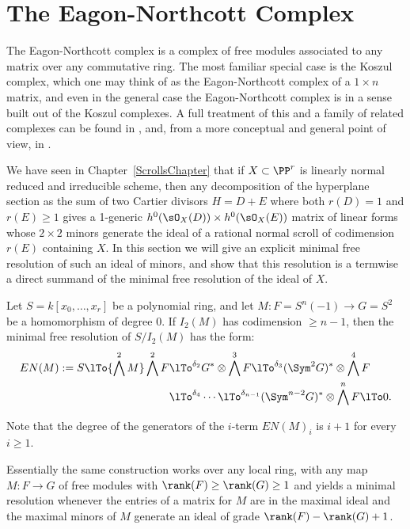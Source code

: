 \section{The Eagon-Northcott Complex}\label{EN section}

The Eagon-Northcott complex is a complex of free modules associated to any matrix over any commutative ring. The most familiar special case is the Koszul complex, which one may think of as the Eagon-Northcott complex of a $1\times n$ matrix, and  even in the general case the Eagon-Northcott complex is in a sense built out of the Koszul complexes. A full treatment of this and a family of related complexes can be found in 
\cite[Appendix A2]{Eisenbud1995}, and, from a more conceptual and general point of view, in \cite{Weyman-book}. 

We have seen in Chapter~\ref{ScrollsChapter} that if $X\subset \PP^r$ is linearly normal reduced and irreducible scheme, then any decomposition
of the hyperplane section as the sum of two Cartier divisors
 $H = D+E$ where both $r(D) = 1$ and $r(E)\geq 1$ gives a 1-generic $h^0(\sO_X(D)) \times h^0(\sO_X(E))$
 matrix of linear forms whose $2\times 2$ minors generate the ideal of a rational normal scroll of codimension $r(E)$
 containing $X$. In this section we will give an explicit minimal free resolution of such an ideal of minors, and show that 
 this resolution is a termwise a direct summand of the
 minimal free resolution of the ideal of $X$.

\begin{theorem}\label{Eagon-Northcott}\label{E-N}
 Let $S = k[x_0,\dots, x_r]$ be a polynomial ring,  and let 
 $M: F = S^n(-1) \to G= S^2$ be a homomorphism of degree 0. If $I_2(M)$ has codimension $\geq n-1$, then the minimal free resolution of $S/I_2(M)$ has the form:
\begin{align*}
EN(M) := 
S \lTo{\bigwedge^2 M} 
 \bigwedge^2 F&
 \lTo^{\delta_{2}}
 G^*\otimes \bigwedge^3 F  \lTo^{\delta_{3}}
  (\Sym^2G)^*\otimes\bigwedge^4F  \\
 &\lTo^{\delta_{4}}\cdots\lTo^{\delta_{n-1}} 
(\Sym^{n-2}G)^*\otimes\bigwedge^nF 
 \lTo 0.
\end{align*}
\end{theorem}

Note that the degree of the generators of the $i$-term $EN(M)_i$ is $i+1$ for every $i\geq 1$.

Essentially the same construction works over any local ring, with any map $M: F\to G$ of free modules
with $\rank(F) \geq \rank(G) \geq 1$
and yields a minimal resolution whenever the entries of a matrix for $M$ are in the maximal
ideal and the maximal minors of $M$ generate an ideal of grade $\rank(F) - \rank(G)+1$.

